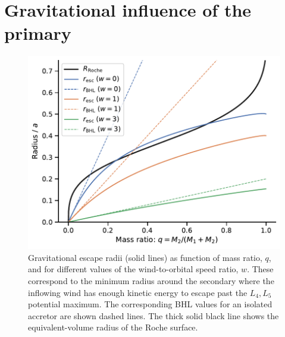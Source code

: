 \documentclass[useAMS, usenatbib, a4paper]{mnras}
\begin{document}
\section{Gravitational influence of the primary}
\label{sec:limit-hill-sphere}
\begin{figure}
  \centering
  \includegraphics[width=\linewidth]{notebooks/roche-escape-L4-radii-vs-q}
  \caption{
    Gravitational escape radii (solid lines) as function of mass ratio,
    \(q\), and for different values of the wind-to-orbital speed ratio, \(w\).
    These correspond to the minimum radius around the secondary where the inflowing wind
    has enough kinetic energy to escape past the \(L_4, L_5\) potential maximum.
    The corresponding BHL values for an isolated accretor are shown dashed lines.
    The thick solid black line shows the equivalent-volume radius of the Roche surface. 
  }
  \label{fig:escape-radii}
\end{figure}
\end{document}
